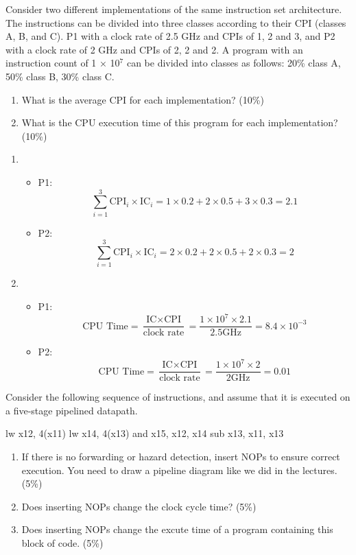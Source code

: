\documentclass[12pt, a4paper]{article}
\begin{document}
\begin{q}{20}
    Consider two different implementations of the same instruction set architecture. The
instructions can be divided into three classes according to their CPI (classes A, B, and
C). P1 with a clock rate of 2.5 GHz and CPIs of 1, 2 and 3, and P2 with a clock rate of
2 GHz and CPIs of 2, 2 and 2. A program with an instruction count of 1 × 10$^7$ can be
divided into classes as follows: 20\% class A, 50\% class B, 30\% class C. 
\begin{enumerate}
    \item What is the average CPI for each implementation? (10\%)
    \item What is the CPU execution time of this program for each implementation? (10\%)
\end{enumerate}
\end{q}
\begin{ans}
\begin{enumerate}
    \item 
    \begin{itemize}
        \item P1: $$\sum_{i=1}^{3}\text{CPI}_i\times\text{IC}_i = 1\times0.2+2\times0.5+3\times0.3=2.1$$
        \item P2: $$\sum_{i=1}^{3}\text{CPI}_i\times\text{IC}_i = 2\times0.2+2\times0.5+2\times0.3=2$$
    \end{itemize}
    \item 
    \begin{itemize}
        \item P1: $$\text{CPU Time}=\frac{\text{IC}\times\text{CPI}}{\text{clock rate}}=\frac{1\times10^7\times2.1}{2.5\text{GHz}}=8.4\times10^{-3}$$
        \item P2: $$\text{CPU Time}=\frac{\text{IC}\times\text{CPI}}{\text{clock rate}}=\frac{1\times10^7\times2}{2\text{GHz}}=0.01$$
    \end{itemize}
\end{enumerate}
\end{ans}
\pagebreak

\begin{q}{15}
    Consider the following sequence of instructions, and assume that it is executed on a
five-stage pipelined datapath.
\begin{code}
    lw x12, 4(x11)
    lw x14, 4(x13)
    and x15, x12, x14
    sub x13, x11, x13
\end{code}
\begin{enumerate}
    \item If there is no forwarding or hazard detection, insert NOPs to ensure correct execution.
    You need to draw a pipeline diagram like we did in the lectures. (5\%)
    \item Does inserting NOPs change the clock cycle time? (5\%)
    \item Does inserting NOPs change the excute time of a program containing this block of
    code. (5\%)
\end{enumerate}
\end{q}
\begin{ans}
    
\end{ans}
\pagebreak
\end{document}
